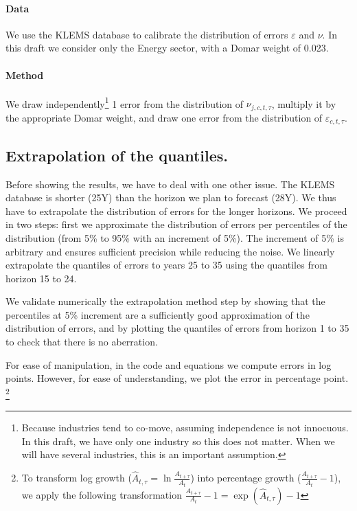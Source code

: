 \paragraph{Data} We use the KLEMS database to calibrate the distribution of errors $\varepsilon$ and $\nu$. 
In this draft we consider only the Energy sector, with a Domar weight of 0.023. 

\paragraph{Method} We draw independently\footnote{
%
Because industries tend to co-move, assuming independence is not innocuous. In this draft, we have only one industry so this does not matter. When we will have several industries, this is an important assumption.
%
} 1 error from the distribution of $\nu_{j,c,t,\tau}$, multiply it by the appropriate Domar weight, and draw one error from the distribution of $\varepsilon_{c,t,\tau}$.%


\subsection{Extrapolation of the quantiles.} 

Before showing the results, we have to deal with one other issue. The KLEMS database is shorter (25Y) than the horizon we plan to forecast (28Y). We thus have to extrapolate the distribution of errors for the longer horizons. We proceed in two steps: first we approximate the distribution of errors per percentiles of the distribution (from 5\% to 95\% with an increment of 5\%). The increment of 5\% is arbitrary and ensures sufficient precision while reducing the noise. We linearly extrapolate the quantiles of errors to years 25 to 35 using the quantiles from horizon 15 to 24.

We validate numerically the extrapolation method step by showing that the percentiles at 5\% increment are a sufficiently good approximation of the distribution of errors, and by plotting the quantiles of errors from horizon 1 to 35 to check that there is no aberration. 

For ease of manipulation, in the code and equations we compute errors in log points. However, for ease of understanding, we plot the error in percentage point.
\footnote{
To transform log growth ($\hat{A}_{t,\tau}=\ln\frac{A_{t+\tau}}{A_{t}}$) into percentage growth ($\frac{A_{t+\tau}}{A_{t}}-1$), we apply the following transformation $\frac{A_{t+\tau}}{A_{t}}-1=\exp (\hat{A}_{t,\tau})-1$
}


